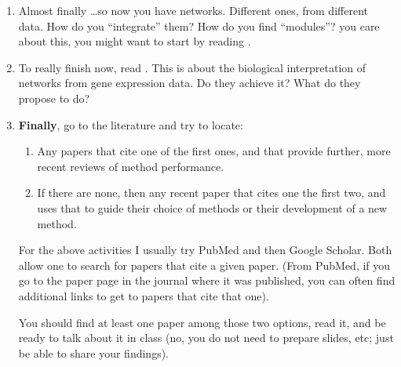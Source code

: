 \begin{enumerate}
\item Almost finally \ldots so now you have networks. Different ones, from
  different data. How do you ``integrate'' them? How do you find
  ``modules''?  you care about this, you might want to start by reading
  \cite{Mitra2013}.



\item To really finish now, read \cite{Emmert-Streib2014}. This is about
  the biological interpretation of networks from gene expression data. Do
  they achieve it? What do they propose to do?


\item \textbf{Finally}, go to the literature and try to locate:
  \begin{enumerate}
  \item Any papers that cite one of the first ones, and that provide
    further, more recent reviews of method performance.
  \item If there are none, then any recent paper that cites one the first
    two, and uses that to guide their choice of methods or their
    development of a new method.
  \end{enumerate}


  For the above activities I usually try PubMed and then Google
  Scholar. Both allow one to search for papers that cite a given
  paper. (From PubMed, if you go to the paper page in the journal where it
  was published, you can often find additional links to get to papers that
  cite that one).


  You should find at least one paper among those two options, read it, and
  be ready to talk about it in class (no, you do not need to
  prepare slides, etc; just be able to share your findings).

\end{enumerate}



















